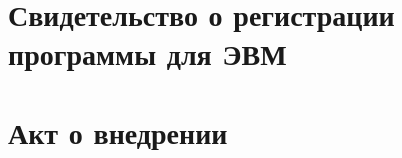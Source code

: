 \chapter{Свидетельство о регистрации программы для ЭВМ}


\begin{figure}[ht]
    \label{fig:app_program_mukhtarov}
\end{figure}

\chapter{Акт о внедрении}


\begin{figure}[ht]
    \label{fig:app_implementation_act_mukhtarov}
\end{figure}









